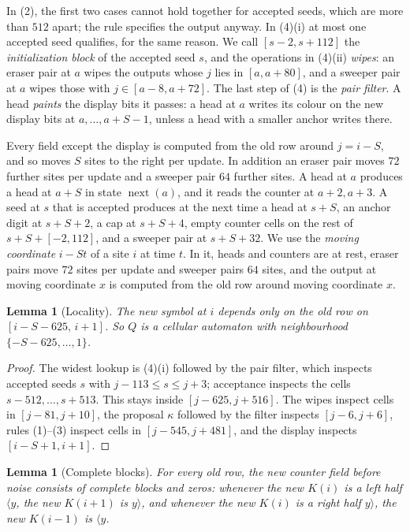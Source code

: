 \documentclass[11pt]{article}
\theoremstyle{plain}
\newtheorem{lemma}[theorem]{Lemma}
\theoremstyle{definition}
\theoremstyle{remark}
\newcommand{\Lh}[1]{\langle #1}
\newcommand{\Rh}[1]{#1\rangle}
\newcommand{\nxt}{\operatorname{next}}
\begin{document}
In (2), the first two cases cannot hold together for accepted seeds, which are more than $512$ apart; the rule specifies the output anyway. In (4)(i) at most one accepted seed qualifies, for the same reason. We call $[s-2,s+112]$ the \emph{initialization block} of the accepted seed $s$, and the operations in (4)(ii) \emph{wipes}: an eraser pair at $a$ wipes the outputs whose $j$ lies in $[a,a+80]$, and a sweeper pair at $a$ wipes those with $j\in[a-8,a+72]$. The last step of (4) is the \emph{pair filter}. A head \emph{paints} the display bits it passes: a head at $a$ writes its colour on the new display bits at $a,\dots,a+S-1$, unless a head with a smaller anchor writes there.

Every field except the display is computed from the old row around $j=i-S$, and so moves $S$ sites to the right per update. In addition an eraser pair moves $72$ further sites per update and a sweeper pair $64$ further sites. A head at $a$ produces a head at $a+S$ in state $\nxt(a)$, and it reads the counter at $a+2,a+3$. A seed at $s$ that is accepted produces at the next time a head at $s+S$, an anchor digit at $s+S+2$, a cap at $s+S+4$, empty counter cells on the rest of $s+S+[-2,112]$, and a sweeper pair at $s+S+32$. We use the \emph{moving coordinate} $i-St$ of a site $i$ at time $t$. In it, heads and counters are at rest, eraser pairs move $72$ sites per update and sweeper pairs $64$ sites, and the output at moving coordinate $x$ is computed from the old row around moving coordinate $x$.

\begin{lemma}[Locality]\label{lem:locality}
The new symbol at $i$ depends only on the old row on $[i-S-625,\,i+1]$. So $Q$ is a cellular automaton with neighbourhood $\{-S-625,\dots,1\}$.
\end{lemma}

\begin{proof}
The widest lookup is (4)(i) followed by the pair filter, which inspects accepted seeds $s$ with $j-113\le s\le j+3$; acceptance inspects the cells $s-512,\dots,s+513$. This stays inside $[j-625,j+516]$. The wipes inspect cells in $[j-81,j+10]$, the proposal $\kappa$ followed by the filter inspects $[j-6,j+6]$, rules (1)--(3) inspect cells in $[j-545,j+481]$, and the display inspects $[i-S+1,i+1]$.
\end{proof}

\begin{lemma}[Complete blocks]\label{lem:complete}
For every old row, the new counter field before noise consists of complete blocks and zeros: whenever the new $K(i)$ is a left half $\Lh y$, the new $K(i+1)$ is $\Rh y$, and whenever the new $K(i)$ is a right half $\Rh y$, the new $K(i-1)$ is $\Lh y$.
\end{lemma}
\end{document}
